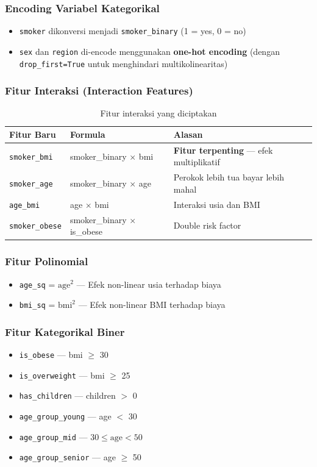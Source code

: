 \documentclass[12pt,a4paper]{article}
\begin{document}
\subsubsection{Encoding Variabel Kategorikal}
\begin{itemize}
    \item \texttt{smoker} dikonversi menjadi \texttt{smoker\_binary} (1 = yes, 0 = no)
    \item \texttt{sex} dan \texttt{region} di-encode menggunakan \textbf{one-hot encoding} (dengan \texttt{drop\_first=True} untuk menghindari multikolinearitas)
\end{itemize}

\subsubsection{Fitur Interaksi (Interaction Features)}
\begin{table}[h!]
\centering
\caption{Fitur interaksi yang diciptakan}
\begin{tabular}{lll}
\toprule
\textbf{Fitur Baru} & \textbf{Formula} & \textbf{Alasan} \\
\midrule
\texttt{smoker\_bmi}   & smoker\_binary $\times$ bmi & \textbf{Fitur terpenting} — efek multiplikatif \\
\texttt{smoker\_age}   & smoker\_binary $\times$ age & Perokok lebih tua bayar lebih mahal \\
\texttt{age\_bmi}      & age $\times$ bmi            & Interaksi usia dan BMI \\
\texttt{smoker\_obese} & smoker\_binary $\times$ is\_obese & Double risk factor \\
\bottomrule
\end{tabular}
\end{table}

\subsubsection{Fitur Polinomial}
\begin{itemize}
    \item \texttt{age\_sq} = $\text{age}^2$ — Efek non-linear usia terhadap biaya
    \item \texttt{bmi\_sq} = $\text{bmi}^2$ — Efek non-linear BMI terhadap biaya
\end{itemize}

\subsubsection{Fitur Kategorikal Biner}
\begin{itemize}
    \item \texttt{is\_obese} — bmi $\geq$ 30
    \item \texttt{is\_overweight} — bmi $\geq$ 25
    \item \texttt{has\_children} — children $>$ 0
    \item \texttt{age\_group\_young} — age $<$ 30
    \item \texttt{age\_group\_mid} — $30 \leq \text{age} < 50$
    \item \texttt{age\_group\_senior} — age $\geq$ 50
\end{itemize}
\end{document}
